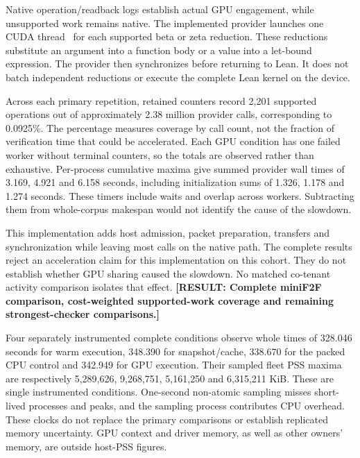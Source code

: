 \documentclass[10pt,twocolumn]{article}
\newcommand{\missing}[1]{\textbf{[RESULT: #1]}}
\begin{document}
Native operation/readback logs establish actual GPU engagement, while
unsupported work remains native. The implemented provider launches one CUDA thread~\cite{cudaProgrammingGuide} for each supported beta or
zeta reduction. These reductions substitute an argument into a function body
or a value into a let-bound expression. The provider then synchronizes before
returning to Lean. It does not batch independent reductions or execute the
complete Lean kernel on the device.

Across each primary repetition, retained counters record 2,201 supported
operations out of approximately 2.38 million provider calls, corresponding to 0.0925\%.
The percentage measures coverage by call count, not the fraction of verification time that
could be accelerated. Each GPU condition has one failed worker without
terminal counters, so the totals are observed rather than exhaustive.
Per-process cumulative maxima give summed provider wall times of
3.169, 4.921 and 6.158 seconds, including initialization sums of
1.326, 1.178 and 1.274 seconds. These timers include waits and overlap
across workers. Subtracting them from whole-corpus makespan would not
identify the cause of the slowdown.

This implementation adds host admission, packet preparation, transfers and
synchronization while leaving most calls on the native path. The complete
results reject an acceleration claim for this implementation on this cohort.
They do not establish whether GPU sharing caused the slowdown. No matched
co-tenant activity comparison isolates that effect.
\missing{Complete miniF2F comparison, cost-weighted supported-work coverage
and remaining strongest-checker comparisons.}

Four separately instrumented complete conditions observe whole times of
328.046 seconds for warm execution, 348.390 for snapshot/cache,
338.670 for the packed CPU control and 342.949 for GPU execution.
Their sampled fleet PSS maxima are respectively 5,289,626, 9,268,751,
5,161,250 and 6,315,211 KiB. These are single instrumented conditions.
One-second non-atomic sampling misses short-lived processes and peaks,
and the sampling process contributes CPU overhead. These clocks do not
replace the primary comparisons or establish replicated memory uncertainty.
GPU context and driver memory, as well as other owners' memory, are outside host-PSS figures.
\end{document}
